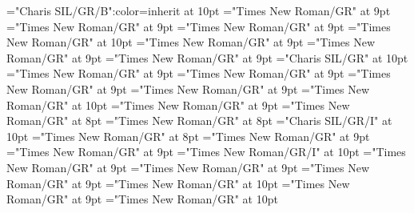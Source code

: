 \documentclass[gps1,twoside]{article}
\begin{document}
\font\aspanbzhheadwordsubentrysubentriesentryletData="Charis SIL/GR/B":color=inherit at 10pt
\font\complexformtypessubentrysubentriesentryletData="Times New Roman/GR" at 9pt
\font\complexformtypecomplexformtypessubentrysubentriesentryletData="Times New Roman/GR" at 9pt
\font\reverseabbrcomplexformtypecomplexformtypessubentrysubentriesentryletData="Times New Roman/GR" at 9pt
\font\spanenreverseabbrcomplexformtypecomplexformtypessubentrysubentriesentryletData="Times New Roman/GR" at 10pt
\font\pronunciationssubentrysubentriesentryletData="Times New Roman/GR" at 9pt
\font\pronunciationpronunciationssubentrysubentriesentryletData="Times New Roman/GR" at 9pt
\font\formpronunciationpronunciationssubentrysubentriesentryletData="Times New Roman/GR" at 9pt
\font\spanbzhfonipaformpronunciationpronunciationssubentrysubentriesentryletData="Charis SIL/GR" at 10pt
\font\sensessubentrysubentriesentryletData="Times New Roman/GR" at 9pt
\font\sensecontentsensessubentrysubentriesentryletData="Times New Roman/GR" at 9pt
\font\sensesensecontentsensessubentrysubentriesentryletData="Times New Roman/GR" at 9pt
\font{}="Times New Roman/GR" at 9pt
\font\spanendefinitionorglosssensesensecontentsensessubentrysubentriesentryletData="Times New Roman/GR" at 10pt
\font\examplessensesensecontentsensessubentrysubentriesentryletData="Times New Roman/GR" at 9pt
\font\exampleexamplessensesensecontentsensessubentrysubentriesentryletData="Times New Roman/GR" at 8pt
\font\exampleexampleexamplessensesensecontentsensessubentrysubentriesentryletData="Times New Roman/GR" at 8pt
\font\spanbzhexampleexampleexamplessensesensecontentsensessubentrysubentriesentryletData="Charis SIL/GR/I" at 10pt
\font\translationsexampleexamplessensesensecontentsensessubentrysubentriesentryletData="Times New Roman/GR" at 8pt
\font\translationtranslationsexampleexamplessensesensecontentsensessubentrysubentriesentryletData="Times New Roman/GR" at 9pt
\font\translationtranslationtranslationsexampleexamplessensesensecontentsensessubentrysubentriesentryletData="Times New Roman/GR" at 9pt
\font\spanentranslationtranslationtranslationsexampleexamplessensesensecontentsensessubentrysubentriesentryletData="Times New Roman/GR/I" at 10pt
\font\semanticdomainssensesensecontentsensessubentrysubentriesentryletData="Times New Roman/GR" at 9pt
\font\semanticdomainsemanticdomainssensesensecontentsensessubentrysubentriesentryletData="Times New Roman/GR" at 9pt
\font\abbreviationsemanticdomainsemanticdomainssensesensecontentsensessubentrysubentriesentryletData="Times New Roman/GR" at 9pt
\font\spanenabbreviationsemanticdomainsemanticdomainssensesensecontentsensessubentrysubentriesentryletData="Times New Roman/GR" at 10pt
\font\namesemanticdomainsemanticdomainssensesensecontentsensessubentrysubentriesentryletData="Times New Roman/GR" at 9pt
\font\spanennamesemanticdomainsemanticdomainssensesensecontentsensessubentrysubentriesentryletData="Times New Roman/GR" at 10pt
\end{document}
